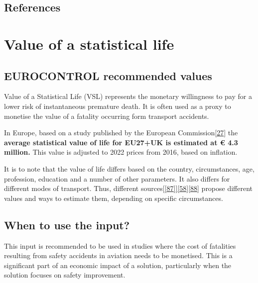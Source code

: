\documentclass[
  11pt,
  a4paper,
]{book}
\begin{document}
\hypertarget{references-37}{%
\section{References}\label{references-37}}

\hypertarget{sec-value-of-a-statistical-life}{%
\chapter{Value of a statistical
life}\label{sec-value-of-a-statistical-life}}

\hypertarget{eurocontrol-recommended-values-35}{%
\section{EUROCONTROL recommended
values}\label{eurocontrol-recommended-values-35}}

Value of a Statistical Life (VSL) represents the monetary willingness to
pay for a lower risk of instantaneous premature death. It is often used
as a proxy to monetise the value of a fatality occurring form transport
accidents.

In Europe, based on a study published by the European
Commission\protect\hyperlink{ref-ecdgmove2019}{{[}27{]}} the
\textbf{average statistical value of life for EU27+UK is estimated at €
4.3 million.} This value is adjusted to 2022 prices from 2016, based on
inflation.

It is to note that the value of life differs based on the country,
circumstances, age, profession, education and a number of other
parameters. It also differs for different modes of transport. Thus,
different
sources{[}\protect\hyperlink{ref-easa2013}{{[}87{]}}{]}\protect\hyperlink{ref-ecdgregio2014}{{[}58{]}}\protect\hyperlink{ref-ecbr2021}{{[}88{]}}
propose different values and ways to estimate them, depending on
specific circumstances.

\hypertarget{when-to-use-the-input-10}{%
\section{When to use the input?}\label{when-to-use-the-input-10}}

This input is recommended to be used in studies where the cost of
fatalities resulting from safety accidents in aviation needs to be
monetised. This is a significant part of an economic impact of a
solution, particularly when the solution focuses on safety improvement.
\end{document}
